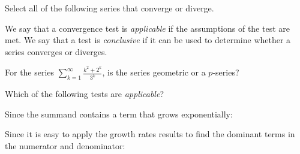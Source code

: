 \documentclass{ximera}
\author{Jim Talamo}
\begin{document}
\begin{exercise}

Select all of the following series that converge or diverge.  

\begin{selectAll}
\end{selectAll}

\begin{hint}
We say that a convergence test is \emph{applicable} if the assumptions of the test are met.  We say that a test is \emph{conclusive} if it can be used to determine whether a series converges or diverges.

\begin{question}
For the series $\sum_{k=1}^{\infty} \frac{k^2+2^k}{3^k}$, is the series geometric or a $p$-series?

\begin{multipleChoice}
\end{multipleChoice}

 Which of the following tests are \emph{applicable}?

\begin{selectAll}
\end{selectAll}

Since the summand contains a term that grows exponentially:

\begin{multipleChoice}
\end{multipleChoice}

Since it is easy to apply the growth rates results to find the dominant terms in the numerator and denominator:

\begin{multipleChoice}
\end{multipleChoice}


\end{question}
\end{hint}
\end{exercise}
\end{document}
